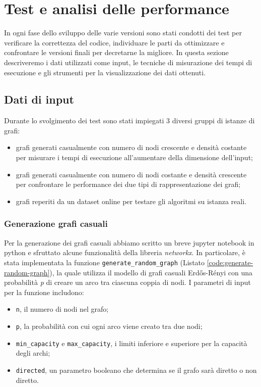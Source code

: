     \newpage
    
    \section{Test e analisi delle performance}

        In ogni fase dello sviluppo delle varie versioni sono stati condotti dei test per verificare la correttezza del codice, individuare le parti da ottimizzare e confrontare le versioni finali per decretarne la migliore.
        In questa sezione descriveremo i dati utilizzati come input, le tecniche di misurazione dei tempi di esecuzione e gli strumenti per la visualizzazione dei dati ottenuti.

        \subsection{Dati di input}

            Durante lo svolgimento dei test sono stati impiegati 3 diversi gruppi di istanze di grafi:
            \begin{itemize}
                \item grafi generati casualmente con numero di nodi crescente e densità costante per misurare i tempi di esecuzione all'aumentare della dimensione dell'input;
                \item grafi generati casualmente con numero di nodi costante e densità crescente per confrontare le performance dei due tipi di rappresentazione dei grafi;
                \item grafi reperiti da un dataset online per testare gli algoritmi su istanza reali.
            \end{itemize}

            \subsubsection*{Generazione grafi casuali}

                Per la generazione dei grafi casuali abbiamo scritto un breve jupyter notebook in python e sfruttato alcune funzionalità della libreria \textit{networkx}.
                In particolare, è stata implementata la funzione \verb|generate_random_graph| (Listato \ref{code:generate-random-graph}), la quale utilizza il modello di grafi casuali Erdős-Rényi con una probabilità \textit{p} di creare un arco tra ciascuna coppia di nodi. I parametri di input per la funzione includono:
                \begin{itemize}
                    \item \verb|n|, il numero di nodi nel grafo;
                    \item \verb|p|, la probabilità con cui ogni arco viene creato tra due nodi;
                    \item \verb|min_capacity| e \verb|max_capacity|, i limiti inferiore e superiore per la capacità degli archi;
                    \item \verb|directed|, un parametro booleano che determina se il grafo sarà diretto o non diretto.
                \end{itemize}
                
